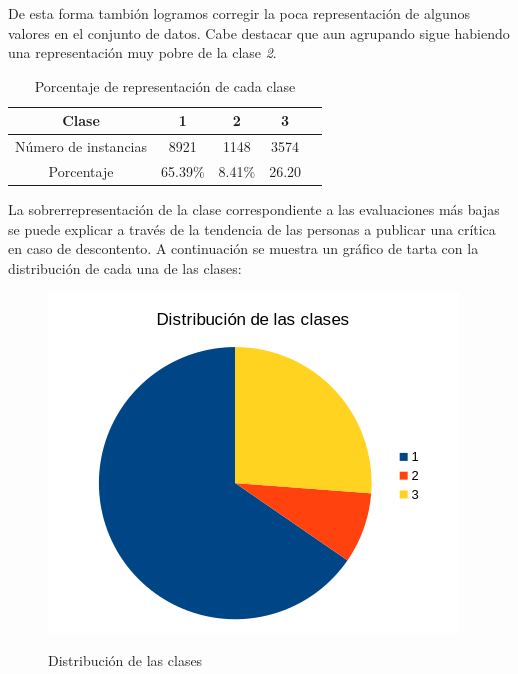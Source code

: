 \documentclass[12pt]{report} %
\begin{document}
De esta forma tambión logramos corregir la poca representación de algunos valores en el conjunto de datos. Cabe destacar que aun agrupando sigue habiendo una representación muy pobre de la clase \textit{2}.

\begin{table}[H]
    \begin{center}
        \begin{tabular}{@{}ccccc@{}}
            \toprule
            Clase                & 1              & 2      & 3\\ 
            \midrule
            Número de instancias & 8921           & 1148   & 3574 \\ 
            Porcentaje           & 65.39\%        & 8.41\% & 26.20\\ 
            \bottomrule
        \end{tabular} 
        \caption{Porcentaje de representación de cada clase}
    \end{center}
\end{table}

La sobrerrepresentación de la clase correspondiente a las evaluaciones más bajas se puede explicar a través de la tendencia de las personas a publicar una crítica en caso de descontento. A continuación se muestra un gráfico de tarta con la distribución de cada una de las clases:

\begin{figure}[H]
    \includegraphics[width=0.60\linewidth]{overall_clases.png}\\ 
    \caption{Distribución de las clases}
\end{figure}
\end{document}

